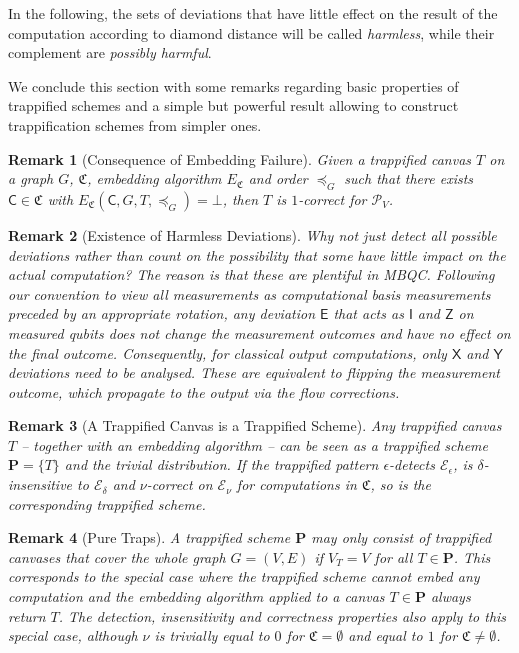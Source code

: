 \documentclass[12pt]{iopart}
\newcommand{\cptp}[1]{\mathsf{#1}} \newcommand{\pd}[1]{\mathcal{#1}}  \newcommand{\sch}[1]{\bm{#1}}
\newcommand{\Id}{\cptp{I}}
\newcommand{\X}{\cptp{X}}
\newcommand{\Z}{\cptp{Z}}
\newcommand{\Y}{\cptp{Y}}
\renewcommand{\1}{\mathds{1}}
\newtheorem{remark}{Remark}
\begin{document}
In the following, the sets of deviations that have little effect on the result of the computation according to diamond distance will be called \emph{harmless}, while their complement are \emph{possibly harmful}.

We conclude this section with some remarks regarding basic properties of trappified schemes and a simple but powerful result allowing to construct trappification schemes from simpler ones.

\begin{remark}[Consequence of Embedding Failure]
Given a trappified canvas $T$ on a graph $G$, $\mathfrak{C}$, embedding algorithm $E_{\mathfrak{C}}$ and order $\preceq_G$ such that there exists $\cptp C \in \mathfrak{C}$ with $E_{\mathfrak{C}}(\cptp{C}, G, T, \preceq_G) = \bot$, then $T$ is $1$-correct for $\mathcal{P}_V$.
\end{remark}

\begin{remark}[Existence of Harmless Deviations]
\label{rem:dev-struct}
Why not just detect all possible deviations rather than count on the possibility that some have little impact on the actual computation? The reason is that these are plentiful in MBQC. Following our convention to view all measurements as computational basis measurements preceded by an appropriate rotation, any deviation $\cptp E$ that acts as $\Id$ and $\Z$ on measured qubits does not change the measurement outcomes and have no effect on the final outcome. Consequently, for classical output computations, only $\X$ and $\Y$ deviations need to be analysed. These are equivalent to flipping the measurement outcome, which propagate to the output via the flow corrections.
\end{remark}

\begin{remark}[A Trappified Canvas is a Trappified Scheme]
\label{rem:tr-can-sch}
	Any trappified canvas $T$ -- together with an embedding algorithm -- can be seen as a trappified scheme $\sch P = \{T\}$ and the trivial distribution. If the trappified pattern $\epsilon$-detects $\mathcal{E}_\epsilon$, is $\delta$-insensitive to $\mathcal{E}_\delta$ and $\nu$-correct on $\mathcal{E}_\nu$ for computations in $\mathfrak{C}$, so is the corresponding trappified scheme.
\end{remark}

\begin{remark}[Pure Traps]
\label{rem:pure_traps}
A trappified scheme $\sch P$ may only consist of trappified canvases that cover the whole graph $G = (V, E)$ if $V_T = V$ for all $T \in \sch P$. This corresponds to the special case where the trappified scheme cannot embed any computation and the embedding algorithm applied to a canvas $T \in \sch P$ always return $T$. The detection, insensitivity and correctness properties also apply to this special case, although $\nu$ is trivially equal to $0$ for $\mathfrak{C} = \emptyset$ and equal to $1$ for $\mathfrak{C} \neq \emptyset$.

\end{remark}
\end{document}
